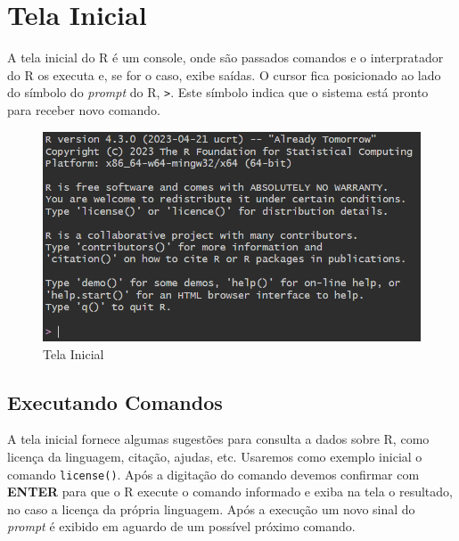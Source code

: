 \documentclass[
  letterpaper,
  DIV=11,
  numbers=noendperiod]{scrreprt}
\begin{document}
\hypertarget{tela-inicial}{%
\section{Tela Inicial}\label{tela-inicial}}

A tela inicial do R é um console, onde são passados comandos e o
interpratador do R os executa e, se for o caso, exibe saídas. O cursor
fica posicionado ao lado do símbolo do \emph{prompt} do R,
\texttt{\textgreater{}}. Este símbolo indica que o sistema está pronto
para receber novo comando.

\begin{figure}

{\centering \includegraphics{./images/r/intro/tela_inicial.png}

}

\caption{\label{fig-r-intro-tela-inicial}Tela Inicial}

\end{figure}

\hypertarget{executando-comandos}{%
\subsection{Executando Comandos}\label{executando-comandos}}

A tela inicial fornece algumas sugestões para consulta a dados sobre R,
como licença da linguagem, citação, ajudas, etc. Usaremos como exemplo
inicial o comando \texttt{license()}. Após a digitação do comando
devemos confirmar com \textbf{ENTER} para que o R execute o comando
informado e exiba na tela o resultado, no caso a licença da própria
linguagem. Após a execução um novo sinal do \emph{prompt} é exibido em
aguardo de um possível próximo comando.
\end{document}
